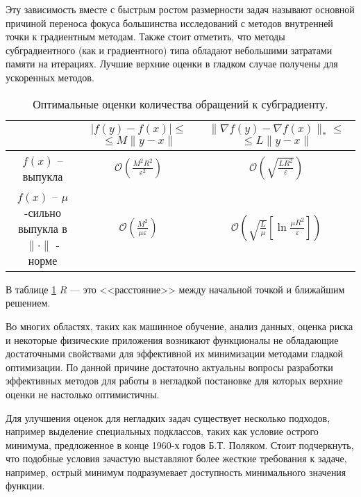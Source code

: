 Эту зависимость вместе с быстрым ростом размерности задач называют основной причиной переноса фокуса большинства исследований с методов внутренней точки к градиентным методам. Также стоит отметить, что методы субградиентного (как и градиентного) типа обладают небольшими затратами памяти на итерациях. Лучшие верхние оценки в гладком случае получены для ускоренных методов. \cite{Nesterov1983} 

\begin{table}[h]
    \caption{Оптимальные оценки количества обращений к субградиенту.}
    \label{est_tbl}
    \centering
    \begin{tabular}{|c|c|c|}
        \hline
         & \makecell{$|f(y) - f(x)| \leq$ \\ $\leq M \| y - x \|$} & \makecell{$\|\nabla f(y) - \nabla f(x)\|_* \leq $\\ $\leq L \| y - x \|$} \\
        \hline
        $f(x)$ -- выпукла & $\mathcal{O} \left( \frac{M^2 R^2}{\varepsilon^2} \right)$ & $\mathcal{O} \left( \sqrt{\frac{L R^2}{\varepsilon}} \right)$ \\
        \hline
        \makecell{$f(x)$ -- $\mu$-сильно \\ выпукла в $\| \cdot \|$ - норме} & $\mathcal{O} \left( \frac{M^2}{\mu \varepsilon} \right)$ & $\mathcal{O} \left( \sqrt{\frac{L}{\mu}} \left[\ln{\frac{\mu R^2}{\varepsilon}}\right] \right)$ \\
        \hline
    \end{tabular}
\end{table}
В таблице \ref{est_tbl} $R$ --- это <<расстояние>> между начальной точкой и ближайшим решением. 

Во многих областях, таких как машинное обучение, анализ данных, оценка риска и некоторые физические приложения возникают функционалы не обладающие достаточными свойствами для эффективной их минимизации методами гладкой оптимизации. По данной причине достаточно актуальны вопросы разработки эффективных методов для работы в негладкой постановке для которых верхние оценки не настолько оптимистичны. 

Для улучшения оценок для негладких задач существует несколько подходов, например выделение специальных подклассов, таких как условие острого минимума, предложенное в конце 1960-х годов Б.Т. Поляком. Стоит подчеркнуть, что подобные условия зачастую выставляют более жесткие требования к задаче, например, острый минимум подразумевает доступность минимального значения функции. 

